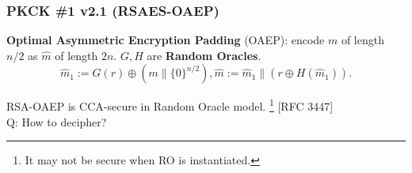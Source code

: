 \begin{comment}
\begin{frame}\frametitle{PKCS \#1 v1.5 (RSAES-PKCS1-v1\_5)}
\textbf{Public-Key Cryptography Standard (PKCS) \#1 version 1.5}:
\begin{itemize}
\item $N$ has $k$ bytes, $2^{8(k-1)} \le N < 2^{8k}$.
\item Message $m$ has $D (\le k-11)$ bytes.
\item Random pad $r$ has $(k-D-3)$ bytes without $\{0\}^8$.
\item The ciphertext:
\end{itemize}
\[[(\{0\}^8\|\{0\}^610\|r\|\{0\}^8\|m)^e \bmod N]\] 
\textbf{Security}: PKCS \#1 v1.5 is believed to be CPA-secure, although no proof based on the RSA assumption has ever been shown.
\end{frame}
\begin{frame}\frametitle{Attack on PKCS \#1 v1.5}
\textbf{PKCS \#1 v1.5 used in HTTPS}:\\
if the first 16 bits of message is not ``02'' which is standing for ``PKCK \#1'', then the web server returns error.\newline

\textbf{CCA to infer the message $m$ of ciphertext $c$}:
\begin{enumerate}
\item choose a string $r$, compute $c' \gets r^e\cdot c = (r\cdot \mathsf{PKCS1}(m))^e$.
\item send $c'$ to the web server. If the server does not return error, some bits of $m$ can be learned.
\item change $r$ and learn other bits of $m$.
\end{enumerate}

\textbf{HTTPS Defense} [RFC 5246]: if not ``02'', set the message as a random string.
\end{frame}
\end{comment}
\begin{frame}\frametitle{PKCK \#1 v2.1 (RSAES-OAEP)}
\textbf{Optimal Asymmetric Encryption Padding} (OAEP): encode $m$ of length $n/2$ as $\hat{m}$ of length $2n$. $G, H$ are \textbf{Random Oracles}.
\[ \hat{m}_1 := G(r)\oplus (m\| \{0\}^{n/2}), \hat{m} := \hat{m}_1 \| (r \oplus H(\hat{m}_1)).\]
\begin{figure}
\begin{center}

\end{center}
\end{figure}
RSA-OAEP is CCA-secure in Random Oracle model. \footnote{It may not be secure when RO is instantiated.} [RFC 3447]\\
\alert{Q: How to decipher?}
\end{frame}
